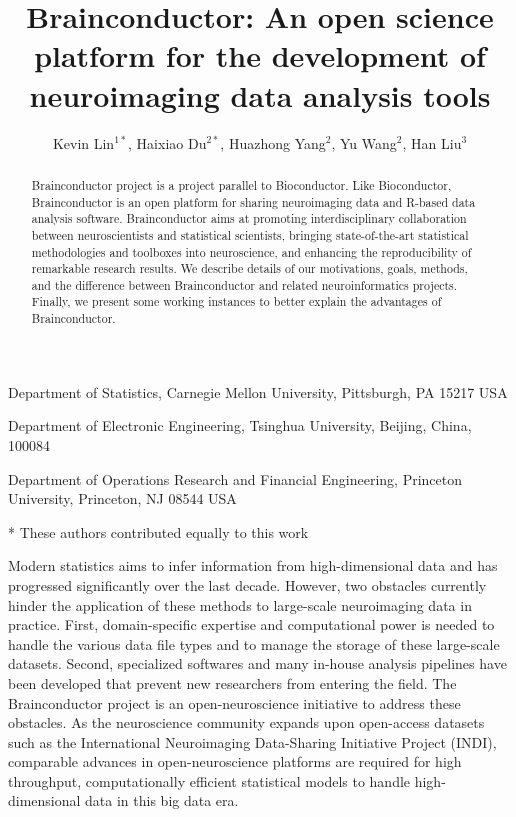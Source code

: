\documentclass{nature}
\title{Brainconductor: An open science platform for the development of
neuroimaging
data analysis tools}
\author{Kevin Lin$^{1*}$, Haixiao Du$^{2*}$, Huazhong
Yang$^2$, Yu Wang$^2$, Han Liu$^3$}
\begin{document}
\maketitle



\begin{affiliations}
\item Department of Statistics, Carnegie Mellon University,
Pittsburgh, PA 15217 USA
\item Department of Electronic Engineering, Tsinghua University, Beijing, China,
100084
\item Department of Operations Research and Financial Engineering, Princeton
University, Princeton, NJ 08544 USA
\item[*] These authors contributed equally to this work
\end{affiliations}

\begin{abstract}
    Brainconductor project is a project parallel to Bioconductor. Like
Bioconductor, Brainconductor is an open platform for sharing neuroimaging data
and R-based data analysis software. Brainconductor aims at promoting
interdisciplinary collaboration between neuroscientists and
statistical scientists, bringing state-of-the-art statistical methodologies and
toolboxes into neuroscience, and enhancing the reproducibility of remarkable
research results. We describe details of our motivations, goals, methods, and
the difference between Brainconductor and related neuroinformatics projects.
Finally, we present some working instances to better explain the advantages of
Brainconductor.
\end{abstract}


Modern statistics aims to infer information from high-dimensional data
and has progressed significantly over the last decade.
However, two obstacles currently hinder the
application of these methods to large-scale neuroimaging data
in practice.
First, domain-specific expertise and computational power is needed to handle
the various data file types and to manage the storage
of these large-scale datasets. Second, specialized softwares and
many in-house analysis pipelines have been developed that
prevent new researchers from entering the field.
The Brainconductor project is an open-neuroscience
initiative to address
these obstacles.
As the neuroscience community expands upon open-access
datasets such as the  International Neuroimaging Data-Sharing
Initiative Project (INDI), comparable advances in
open-neuroscience platforms are required
for high
throughput, computationally efficient statistical models
to handle high-dimensional data in this big data era.
\end{document}
